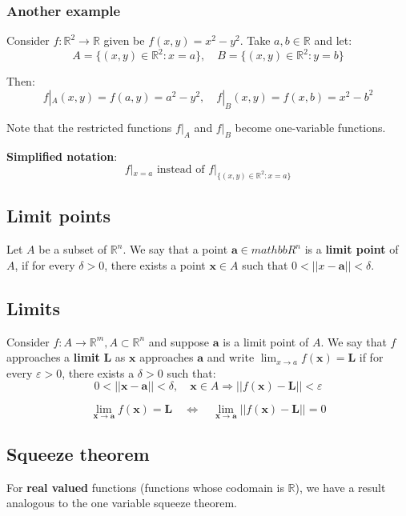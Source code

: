 \documentclass[11pt]{article}
\begin{document}
\subsubsection{Another example}
\label{sec:org404c99d}
Consider \(f : \mathbb{R}^2 \rightarrow \mathbb{R}\) given be \(f(x, y) = x^2 - y^2\). Take \(a, b \in \mathbb{R}\) and let:
\[A = \{(x, y) \in \mathbb{R}^2 : x = a\}, \quad B = \{(x, y) \in \mathbb{R}^2 : y = b\}\]

Then:
\[f|_A (x, y) = f(a, y) = a^2 - y^2, \quad f|_B (x, y) = f(x, b) = x^2 - b^2\]

Note that the restricted functions \(f|_A\) and \(f|_B\) become one-variable functions.


\textbf{Simplified notation}:
\[f|_{x = a} \text{ instead of } f|_{\{(x, y) \in \mathbb{R}^2 : x = a\}}\]
\subsection{Limit points}
\label{sec:org38f015c}
Let \(A\) be a subset of \(\mathbb{R}^n\). We say that a point \(\boldsymbol{a} \in mathbb{R}^n\) is a \textbf{limit point} of \(A\), if for every \(\delta > 0\), there exists a point \(\boldsymbol{x} \in A\) such that \(0 < ||x - \boldsymbol{a}|| < \delta\).
\subsection{Limits}
\label{sec:orgf9d0803}
Consider \(f : A \rightarrow \mathbb{R}^m, A \subset \mathbb{R}^n\) and suppose \(\boldsymbol{a}\) is a limit point of \(A\). We say that \(f\) approaches a \textbf{limit} \(\boldsymbol{L}\) as \(\boldsymbol{x}\) approaches \(\boldsymbol{a}\) and write \(\lim_{x \rightarrow a} f(\boldsymbol{x}) = \boldsymbol{L}\) if for every \(\varepsilon > 0\), there exists a \(\delta > 0\) such that:
\[0 < ||\boldsymbol{x} - \boldsymbol{a}|| < \delta, \quad \boldsymbol{x} \in A \Rightarrow ||f(\boldsymbol{x}) - \boldsymbol{L}|| < \varepsilon\]

\[\lim_{\boldsymbol{x} \rightarrow \boldsymbol{a}} f(\boldsymbol{x}) = \boldsymbol{L} \quad \Leftrightarrow \quad \lim_{\boldsymbol{x} \rightarrow \boldsymbol{a}} ||f(\boldsymbol{x}) - \boldsymbol{L}|| = 0\]
\subsection{Squeeze theorem}
\label{sec:orga7d5490}
For \textbf{real valued} functions (functions whose codomain is \(\mathbb{R}\)), we have a result analogous to the one variable squeeze theorem.
\end{document}
